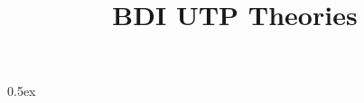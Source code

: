 \documentclass[11pt,a4paper]{article}
\begin{document}
\title{BDI UTP Theories}
\maketitle

\parindent 0pt \parskip 0.5ex



% 
% 
\end{document}
